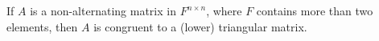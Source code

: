 If $A$ is a non-alternating matrix in $F^{n \times n}$, where $F$ contains more than two elements, then $A$ is congruent to a (lower) triangular matrix.
